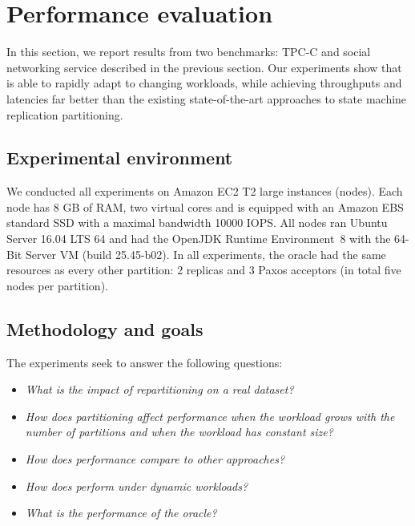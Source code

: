 \section{Performance evaluation}
\label{sec:dynastar-experiments}

In this section, we report results from two benchmarks: TPC-C and
\dynastarappname{} social networking service described in the previous section.
Our experiments show that \dynastar{} is able to rapidly adapt to changing
workloads, while achieving throughputs and latencies far better than the
existing state-of-the-art approaches to state machine replication partitioning.


\subsection{Experimental environment}
\label{sec:dynastar-evaluation:setup}

We conducted all experiments on Amazon EC2 T2 large instances (nodes). Each node
has 8 GB of RAM, two virtual cores and is equipped with an Amazon EBS standard
SSD with a maximal bandwidth 10000 IOPS. All nodes ran Ubuntu Server 16.04 LTS
64 and had the OpenJDK Runtime Environment~8 with the \mbox{64-Bit} Server VM
(build 25.45-b02). In all experiments, the oracle had the same resources as
every other partition: 2 replicas and 3 Paxos acceptors (in total five nodes per
partition).


\subsection{Methodology and goals}
\label{sec:dynastar-evaluation:methodology}

The experiments seek to answer the following questions:
\begin{itemize}
\item \emph{What is the impact of repartitioning on a real dataset?}
\item \emph{How does partitioning affect performance when the workload grows with the number of partitions and when the workload has constant size?}
\item \emph{How does \dynastar performance compare to other approaches?}
\item \emph{How does \dynastar perform under dynamic workloads?}
\item \emph{What is the performance of the oracle?}
\end{itemize}

